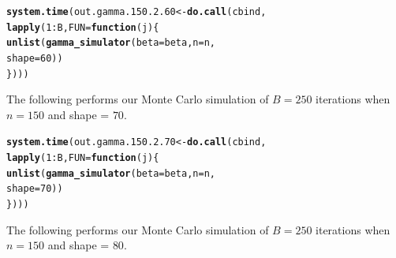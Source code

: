 \documentclass[11pt]{article}\usepackage[]{graphicx}\usepackage[]{color}
\makeatletter
\newcommand{\hlnum}[1]{\textcolor[rgb]{0.686,0.059,0.569}{#1}}%
\newcommand{\hlopt}[1]{\textcolor[rgb]{0,0,0}{#1}}%
\newcommand{\hlstd}[1]{\textcolor[rgb]{0.345,0.345,0.345}{#1}}%
\newcommand{\hlkwa}[1]{\textcolor[rgb]{0.161,0.373,0.58}{\textbf{#1}}}%
\newcommand{\hlkwb}[1]{\textcolor[rgb]{0.69,0.353,0.396}{#1}}%
\newcommand{\hlkwc}[1]{\textcolor[rgb]{0.333,0.667,0.333}{#1}}%
\newcommand{\hlkwd}[1]{\textcolor[rgb]{0.737,0.353,0.396}{\textbf{#1}}}%
\newenvironment{kframe}{%
 \def\at@end@of@kframe{}%
 \ifinner\ifhmode%
  \def\at@end@of@kframe{\end{minipage}}%
  \begin{minipage}{\columnwidth}%
 \fi\fi%
 \def\FrameCommand##1{\hskip\@totalleftmargin \hskip-\fboxsep
 \colorbox{shadecolor}{##1}\hskip-\fboxsep
     \hskip-\linewidth \hskip-\@totalleftmargin \hskip\columnwidth}%
 \MakeFramed {\advance\hsize-\width
   \@totalleftmargin\z@ \linewidth\hsize
   \@setminipage}}%
 {\par\unskip\endMakeFramed%
 \at@end@of@kframe}
\newenvironment{knitrout}{}{} %
\makeatother
\begin{document}
\begin{knitrout}
\color{fgcolor}\begin{kframe}
\begin{alltt}
\hlkwd{system.time}\hlstd{(out.gamma.150.2.60} \hlkwb{<-} \hlkwd{do.call}\hlstd{(cbind,}
  \hlkwd{lapply}\hlstd{(}\hlnum{1}\hlopt{:}\hlstd{B,} \hlkwc{FUN} \hlstd{=} \hlkwa{function}\hlstd{(}\hlkwc{j}\hlstd{)\{}
    \hlkwd{unlist}\hlstd{(}\hlkwd{gamma_simulator}\hlstd{(}\hlkwc{beta} \hlstd{= beta,} \hlkwc{n} \hlstd{= n,}
      \hlkwc{shape} \hlstd{=} \hlnum{60}\hlstd{))}
\hlstd{\})))}
\end{alltt}


{\ttfamily\noindent\bfseries\color{errorcolor}{\#\# Error in r[, l]/mad.predict.fun(out.mad, xx): non-numeric argument to binary operator}}

{\ttfamily\noindent\itshape\color{messagecolor}{\#\# Timing stopped at: 1.759 0.004 1.768}}\end{kframe}
\end{knitrout}


The following performs our Monte Carlo simulation of $B = 250$ iterations 
when $n = 150$ and shape = $70$.

\begin{knitrout}
\color{fgcolor}\begin{kframe}
\begin{alltt}
\hlkwd{system.time}\hlstd{(out.gamma.150.2.70} \hlkwb{<-} \hlkwd{do.call}\hlstd{(cbind,}
  \hlkwd{lapply}\hlstd{(}\hlnum{1}\hlopt{:}\hlstd{B,} \hlkwc{FUN} \hlstd{=} \hlkwa{function}\hlstd{(}\hlkwc{j}\hlstd{)\{}
    \hlkwd{unlist}\hlstd{(}\hlkwd{gamma_simulator}\hlstd{(}\hlkwc{beta} \hlstd{= beta,} \hlkwc{n} \hlstd{= n,}
      \hlkwc{shape} \hlstd{=} \hlnum{70}\hlstd{))}
\hlstd{\})))}
\end{alltt}


{\ttfamily\noindent\bfseries\color{errorcolor}{\#\# Error in r[, l]/mad.predict.fun(out.mad, xx): non-numeric argument to binary operator}}

{\ttfamily\noindent\itshape\color{messagecolor}{\#\# Timing stopped at: 1.729 0 1.732}}\end{kframe}
\end{knitrout}


The following performs our Monte Carlo simulation of $B = 250$ iterations 
when $n = 150$ and shape = $80$.
\end{document}
